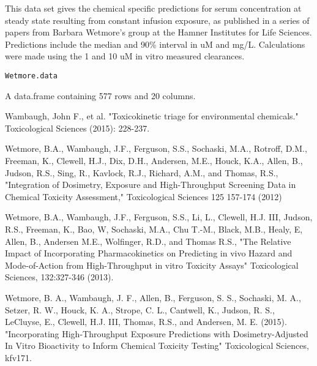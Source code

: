 \documentclass[a4paper]{book}
\begin{document}
%
\begin{Description}\relax
This data set gives the chemical specific predictions for serum
concentration at steady state resulting from constant infusion exposure, as
published in a series of papers from Barbara Wetmore's group at the Hamner
Institutes for Life Sciences. Predictions include the median and 90\%
interval in uM and mg/L. Calculations were made using the 1 and 10 uM in
vitro measured clearances.
\end{Description}
%
\begin{Usage}
\begin{verbatim}
Wetmore.data
\end{verbatim}
\end{Usage}
%
\begin{Format}
A data.frame containing 577 rows and 20 columns.
\end{Format}
%
\begin{Source}\relax
Wambaugh, John F., et al. "Toxicokinetic triage for environmental
chemicals." Toxicological Sciences (2015): 228-237.
\end{Source}
%
\begin{References}\relax
Wetmore, B.A., Wambaugh, J.F., Ferguson, S.S., Sochaski, M.A.,
Rotroff, D.M., Freeman, K., Clewell, H.J., Dix, D.H., Andersen, M.E., Houck,
K.A., Allen, B., Judson, R.S., Sing, R., Kavlock, R.J., Richard, A.M., and
Thomas, R.S., "Integration of Dosimetry, Exposure and High-Throughput
Screening Data in Chemical Toxicity Assessment," Toxicological Sciences 125
157-174 (2012)

Wetmore, B.A., Wambaugh, J.F., Ferguson, S.S., Li, L., Clewell, H.J. III,
Judson, R.S., Freeman, K., Bao, W, Sochaski, M.A., Chu T.-M., Black, M.B.,
Healy, E, Allen, B., Andersen M.E., Wolfinger, R.D., and Thomas R.S., "The
Relative Impact of Incorporating Pharmacokinetics on Predicting in vivo
Hazard and Mode-of-Action from High-Throughput in vitro Toxicity Assays"
Toxicological Sciences, 132:327-346 (2013).

Wetmore, B. A., Wambaugh, J. F., Allen, B., Ferguson, S. S., Sochaski, M.
A., Setzer, R. W., Houck, K. A., Strope, C. L., Cantwell, K., Judson, R. S.,
LeCluyse, E., Clewell, H.J. III, Thomas, R.S., and Andersen, M. E. (2015).
"Incorporating High-Throughput Exposure Predictions with Dosimetry-Adjusted
In Vitro Bioactivity to Inform Chemical Toxicity Testing" Toxicological
Sciences, kfv171.
\end{References}
\end{document}
